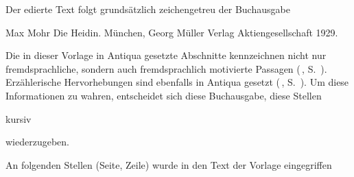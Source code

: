 


Der edierte Text folgt grundsätzlich zeichengetreu der Buchausgabe\dopp{}

Max Mohr\dopp{} Die Heidin. München, Georg Müller Verlag Aktiengesellschaft
1929.

Die in dieser Vorlage in Antiqua gesetzte Abschnitte kennzeichnen nicht nur
fremdsprachliche, sondern auch fremdsprachlich motivierte Passagen
(\,, S.~\pageref{lS47-1}). Erzählerische
Hervorhebungen sind ebenfalls in Antiqua gesetzt (\,,
S.~\pageref{lS48-1}).
Um diese Informationen zu wahren, entscheidet sich diese Buchausgabe,
diese Stellen \begin{it}kursiv\end{it} wiederzugeben.

An folgenden Stellen (Seite, Zeile) wurde in den Text der
Vorlage eingegriffen\dopp{}

\theendnotes
